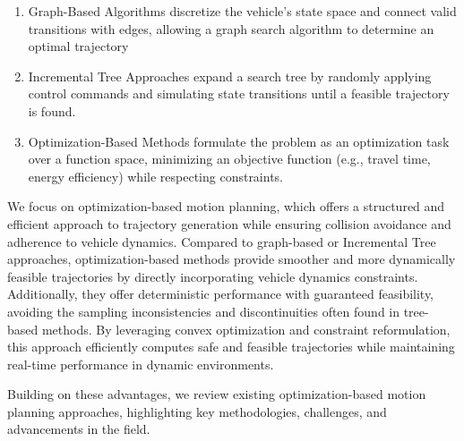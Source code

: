 \begin{enumerate}
	\item Graph-Based Algorithms discretize the vehicle's state space and connect valid
	      transitions with edges, allowing a graph search algorithm to determine an optimal
	      trajectory

	\item Incremental Tree Approaches expand a search tree by randomly applying control
	      commands and simulating state transitions until a feasible trajectory is found.

	\item Optimization-Based Methods formulate the problem as an optimization task over a function space, minimizing an objective function (e.g., travel time, energy efficiency)
	      while respecting constraints.
\end{enumerate}

We focus on optimization-based motion planning, which offers a structured and efficient approach to trajectory generation while ensuring collision
avoidance and adherence to vehicle dynamics.
Compared to graph-based or Incremental Tree approaches, optimization-based methods provide smoother and more dynamically feasible trajectories by
directly incorporating vehicle dynamics constraints.
Additionally, they offer deterministic performance with guaranteed feasibility, avoiding the sampling inconsistencies and discontinuities often found
in tree-based methods.
By leveraging convex optimization and constraint reformulation, this approach efficiently computes safe and feasible trajectories while maintaining
real-time performance in dynamic environments.

Building on these advantages, we review existing optimization-based motion planning approaches, highlighting key methodologies, challenges, and
advancements in the field.
